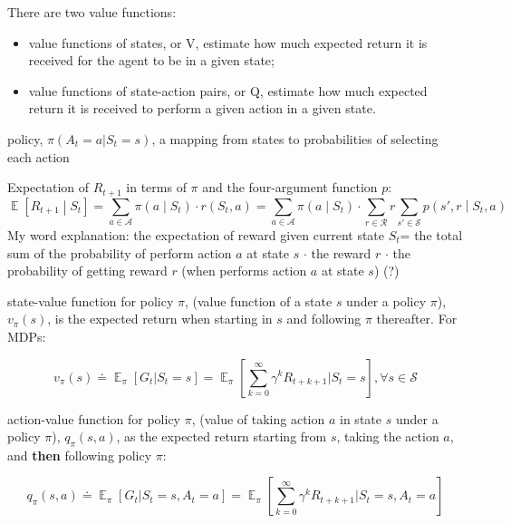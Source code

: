 \documentclass[lang=en,mode=geye,device=normal,color=blue,14pt]{elegantnote}
\DeclareMathOperator*{\E}{\mathbb{E}}
\DeclareMathOperator*{\1}{\mathbbm{1}}
\begin{document}
\begin{definition}
There are two value functions:
\begin{itemize}
\item value functions of states, or V, estimate how much expected return it is received for the agent to be in a given state;
\item value functions of state-action pairs, or Q, estimate how much expected return it is received to perform a given action in a given state.
\end{itemize}
\end{definition}

\begin{definition}
policy, $\pi(A_t=a|S_t=s)$, a mapping from states to probabilities of selecting each action
\end{definition}

Expectation of $R_{t+1}$ in terms of $\pi$ and the four-argument function $p$:
\[
\E\left[R_{t+1} \middle|S_{t}\right] = \sum_{a \in \mathcal{A}} \pi\left(a \middle| S_t\right) \cdot r(S_t, a) = \sum_{a \in \mathcal{A}} \pi\left(a \middle| S_t\right) \cdot \sum_{r \in \mathcal{R}} r \sum_{s' \in \mathcal{S}} p\left(s', r \middle| S_t, a\right)
\]
My word explanation: the expectation of reward given current state $S_t$= the total sum of the probability of perform action $a$ at state $s$ $\cdot$ the reward $r$ $\cdot$ the probability of getting reward $r$ (when performs action $a$ at state $s$) (?)

\begin{definition}
state-value function for policy $\pi$, (value function of a state $s$ under a policy $\pi$), $v_{\pi}(s)$, is the expected return when starting in $s$ and following $\pi$ thereafter. For MDPs:

$$ v_\pi(s) \doteq \E_\pi[G_t | S_t = s] = \E_\pi [ \sum_{k=0}^{\infty} \gamma^k R_{t+k+1} | S_t = s], \forall s \in \mathcal{S} $$
\end{definition}

\begin{definition}
action-value function for policy $\pi$, (value of taking action $a$ in state $s$ under a policy $\pi$), $q_\pi(s,a)$, as the expected return starting from $s$, taking the action $a$, and \textbf{then} following policy $\pi$:

$$ q_\pi(s,a) \doteq \E_\pi [G_t | S_t = s, A_t = a] = \E_\pi [\sum_{k=0}^{\infty} \gamma^k R_{t+k+1} | S_t = s, A_t = a] $$
\end{definition}
\end{document}
